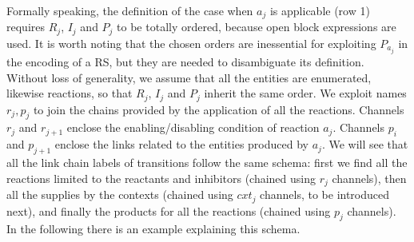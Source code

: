 \noindent
Formally speaking, the definition of the case when $a_j$ is applicable (row 1) requires $R_j$, $I_j$ and $P_j$ to be totally ordered, because open block expressions are used. It is worth noting that the chosen orders are inessential for exploiting $P_{a_j}$ in the encoding of a RS, but they are needed to disambiguate its definition.
Without loss of generality, we  assume that all the entities are enumerated, likewise reactions, so that $R_j$, $I_j$ and $P_j$ inherit the same order. 
%
We exploit names $r_j,p_j$ to join the chains provided by the application of all the reactions. 
Channels $r_j$ and $r_{j+1}$ enclose the enabling/disabling condition of reaction $a_j$.
Channels $p_i$ and $p_{j+1}$ enclose the links related to the entities produced by $a_j$.
We will see that all the link chain labels of transitions follow the same schema: first we find all the reactions limited to the reactants and inhibitors (chained using $r_j$ channels), then all the supplies by the contexts (chained using $cxt_j$ channels, to be introduced next), and finally the products for all the reactions (chained using $p_j$ channels). 
In the following there is an example explaining this schema.

